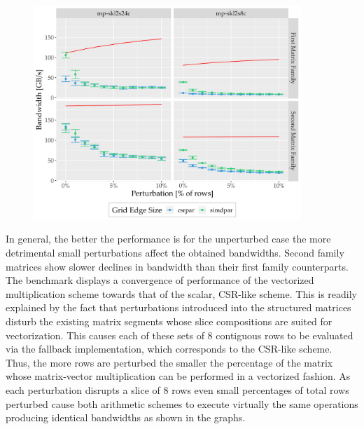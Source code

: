     \begin{figure}[H]
      \centering
      \captionsetup{width=0.9\textwidth}
      \includegraphics[width=0.9\textwidth]{assets/mvm-perturbed-actually-perturbed}
      \label{fig:mvm-perturbed-actually-perturbed}
    \end{figure}


    In general, the better the performance is for the unperturbed case the more detrimental small perturbations affect
    the obtained bandwidths. Second family matrices show slower declines in bandwidth than their first family
    counterparts. The benchmark displays a convergence of performance of the vectorized multiplication scheme towards
    that of the scalar, CSR-like scheme. This is readily explained by the fact that perturbations introduced into the
    structured matrices disturb the existing matrix segments whose slice compositions are suited for vectorization. This
    causes each of these sets of $8$ contiguous rows to be evaluated via the fallback implementation, which corresponds
    to the CSR-like scheme. Thus, the more rows are perturbed the smaller the percentage of the matrix whose
    matrix-vector multiplication can be performed in a vectorized fashion. As each perturbation disrupts a slice of $8$
    rows even small percentages of total rows perturbed cause both arithmetic schemes to execute virtually the same
    operations producing identical bandwidths as shown in the graphs.

